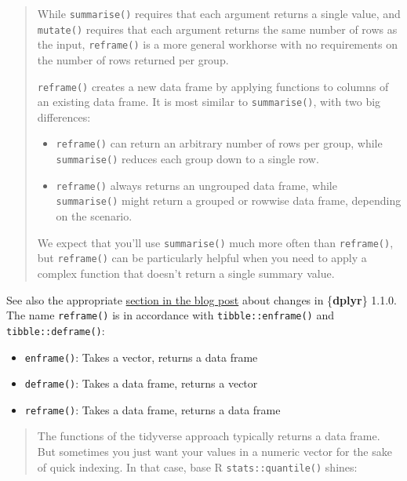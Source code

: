 \documentclass[
  letterpaper,
  DIV=11,
  numbers=noendperiod]{scrreprt}
\providecommand{\tightlist}{%
  \setlength{\itemsep}{0pt}\setlength{\parskip}{0pt}}\usepackage{longtable,booktabs,array}
\begin{document}
\begin{quote}
While \texttt{summarise()} requires that each argument returns a single
value, and \texttt{mutate()} requires that each argument returns the
same number of rows as the input, \texttt{reframe()} is a more general
workhorse with no requirements on the number of rows returned per group.

\texttt{reframe()} creates a new data frame by applying functions to
columns of an existing data frame. It is most similar to
\texttt{summarise()}, with two big differences:

\begin{itemize}
\tightlist
\item
  \texttt{reframe()} can return an arbitrary number of rows per group,
  while \texttt{summarise()} reduces each group down to a single row.
\item
  \texttt{reframe()} always returns an ungrouped data frame, while
  \texttt{summarise()} might return a grouped or rowwise data frame,
  depending on the scenario.
\end{itemize}

We expect that you'll use \texttt{summarise()} much more often than
\texttt{reframe()}, but \texttt{reframe()} can be particularly helpful
when you need to apply a complex function that doesn't return a single
summary value.
\end{quote}

See also the appropriate
\href{https://www.tidyverse.org/blog/2023/02/dplyr-1-1-0-pick-reframe-arrange/\#reframe}{section
in the blog post} about changes in \{\textbf{dplyr}\} 1.1.0. The name
\texttt{reframe()} is in accordance with \texttt{tibble::enframe()} and
\texttt{tibble::deframe()}:

\begin{itemize}
\tightlist
\item
  \texttt{enframe()}: Takes a vector, returns a data frame
\item
  \texttt{deframe()}: Takes a data frame, returns a vector
\item
  \texttt{reframe()}: Takes a data frame, returns a data frame
\end{itemize}

\begin{quote}
The functions of the tidyverse approach typically returns a data frame.
But sometimes you just want your values in a numeric vector for the sake
of quick indexing. In that case, base R \texttt{stats::quantile()}
shines:
\end{quote}
\end{document}
